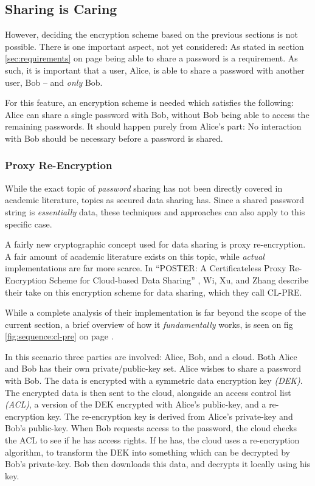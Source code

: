 		\subsection{Sharing is Caring}
			\label{sec:share}
			However, deciding the encryption scheme based on the previous sections is not possible. There is one important aspect, not yet considered: As stated in section \ref{sec:requirements} on page \pageref{sec:requirements} being able to share a password is a requirement. As such, it is important that a user, Alice, is able to share a password with another user, Bob -- and \emph{only} Bob.

			For this feature, an encryption scheme is needed which satisfies the following: Alice can share a single password with Bob, without Bob being able to access the remaining passwords. It should happen purely from Alice's part: No interaction with Bob should be necessary before a password is shared.


			\subsubsection{Proxy Re-Encryption}
				While the exact topic of \emph{password} sharing has not been directly covered in academic literature, topics as secured data sharing has. Since a shared password string is \emph{essentially} data, these techniques and approaches can also apply to this specific case. 

				A fairly new cryptographic concept used for data sharing is proxy re-encryption. A fair amount of academic literature exists on this topic, while \emph{actual} implementations are far more scarce. In ``POSTER: A Certificateless Proxy Re-Encryption Scheme for Cloud-based Data Sharing'' \cite{Wu:2011:PCP:2046707.2093514}, Wi, Xu, and Zhang describe their take on this encryption scheme for data sharing, which they call CL-PRE.

				While a complete analysis of their implementation is far beyond the scope of the current section, a brief overview of how it \emph{fundamentally} works, is seen on fig \ref{fig:sequence:cl-pre} on page \pageref{fig:sequence:cl-pre}.

				In this scenario three parties are involved: Alice, Bob, and a cloud. Both Alice and Bob has their own private/public-key set. Alice wishes to share a password with Bob. The data is encrypted with a symmetric data encryption key \emph{(DEK)}. The encrypted data is then sent to the cloud, alongside an access control list \emph{(ACL)}, a version of the DEK encrypted with Alice's public-key, and a re-encryption key. The re-encryption key is derived from Alice's private-key and Bob's public-key. When Bob requests access to the password, the cloud checks the ACL to see if he has access rights. If he has, the cloud uses a re-encryption algorithm, to transform the DEK into something which can be decrypted by Bob's private-key. Bob then downloads this data, and decrypts it locally using his key.

